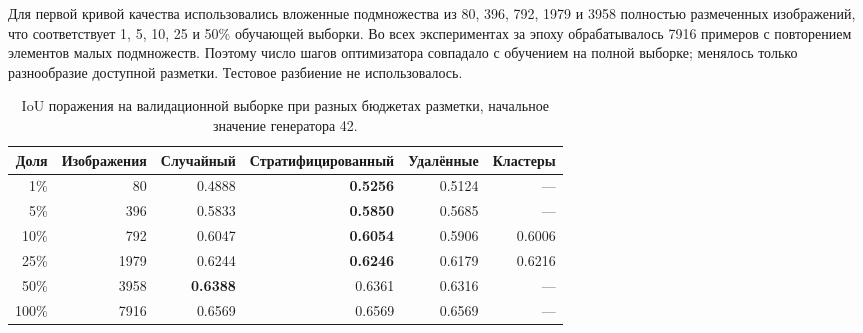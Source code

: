 \documentclass[a4paper,12pt]{extarticle}
\begin{document}
Для первой кривой качества использовались вложенные подмножества из 80, 396,
792, 1979 и 3958 полностью размеченных изображений, что соответствует 1, 5, 10,
25 и 50\% обучающей выборки. Во всех экспериментах за эпоху обрабатывалось 7916 примеров с
повторением элементов малых подмножеств. Поэтому число шагов оптимизатора
совпадало с обучением на полной выборке; менялось только разнообразие доступной разметки.
Тестовое разбиение не использовалось.

\begin{table}[ht]
  \caption{IoU поражения на валидационной выборке при разных бюджетах
  разметки, начальное значение генератора 42.}
  \label{tab:label-efficiency}
  \centering
  \footnotesize
  \begin{tabular}{rrrrrr}
    \toprule
    Доля & Изображения & Случайный & Стратифицированный & Удалённые & Кластеры \\
    \midrule
    1\%   & 80   & 0.4888 & \textbf{0.5256} & 0.5124 & --- \\
    5\%   & 396  & 0.5833 & \textbf{0.5850} & 0.5685 & --- \\
    10\%  & 792  & 0.6047 & \textbf{0.6054} & 0.5906 & 0.6006 \\
    25\%  & 1979 & 0.6244 & \textbf{0.6246} & 0.6179 & 0.6216 \\
    50\%  & 3958 & \textbf{0.6388} & 0.6361 & 0.6316 & --- \\
    100\% & 7916 & 0.6569 & 0.6569 & 0.6569 & --- \\
    \bottomrule
  \end{tabular}
\end{table}
\end{document}
